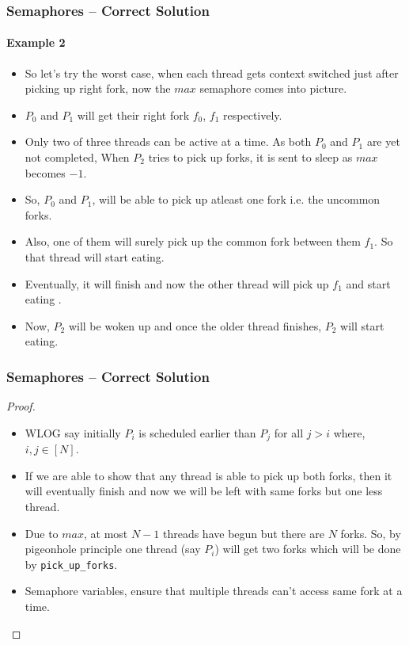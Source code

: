 \documentclass[aspectratio=169, handout, 10pt]{beamer}
\theoremstyle{example}
\begin{document}
\begin{frame}[fragile]\frametitle{Semaphores -- Correct Solution}\framesubtitle{Example 2}
  \begin{example}[continued]
  \begin{itemize}
  \pause\item So let's try the worst case, when each thread gets context switched just after picking up right fork, now the $max$ semaphore comes into picture.
  \pause\item $P_0$ and $P_1$ will get their right fork $f_0$, $f_1$ respectively.
  \pause\item Only two of three threads can be active at a time. As both $P_0$ and $P_1$ are yet not completed, When $P_2$ tries to pick up forks, it is sent to sleep as $max$ becomes $-1$. 
  \pause\item So, $P_0$ and $P_1$, will be able to pick up atleast one fork i.e. the uncommon forks.
  \pause\item Also, one of them will surely pick up the common fork between them $f_1$. So that thread will start eating.
  \pause\item Eventually, it will finish and now the other thread will pick up $f_1$ and start eating .
  \pause\item Now, $P_2$ will be woken up and once the older thread finishes, $P_2$ will start eating.%
  \end{itemize}
  \end{example}
\end{frame}
\begin{frame}[fragile]\frametitle{Semaphores -- Correct Solution}%
  \begin{proof}
  \begin{itemize}
  \pause\item WLOG say initially $P_i$ is scheduled earlier than $P_j$ for all $j > i$ where,  $i, j \in [N]$. %
  \pause\item If we are able to show that any thread is able to pick up both forks, then it will eventually finish and now we will be left with same forks but one less thread.
  \pause\item Due to $max$, at most $N-1$ threads have begun but there are $N$ forks. So, by pigeonhole principle one thread (say $P_i$) will get two forks which will be done by \verb!pick_up_forks!.
  \pause\item Semaphore variables, ensure that multiple threads can’t access same fork at a time.
  \end{itemize}
\end{proof}
\end{frame}
\end{document}
